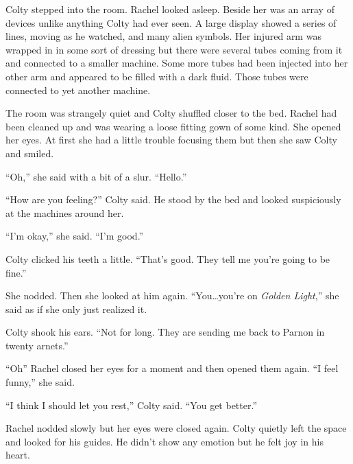 
Colty stepped into the room. Rachel looked asleep. Beside her was an array of devices unlike
anything Colty had ever seen. A large display showed a series of lines, moving as he watched,
and many alien symbols. Her injured arm was wrapped in in some sort of dressing but there were
several tubes coming from it and connected to a smaller machine. Some more tubes had been
injected into her other arm and appeared to be filled with a dark fluid. Those tubes were
connected to yet another machine.

The room was strangely quiet and Colty shuffled closer to the bed. Rachel had been cleaned up
and was wearing a loose fitting gown of some kind. She opened her eyes. At first she had a
little trouble focusing them but then she saw Colty and smiled.

``Oh,'' she said with a bit of a slur. ``Hello.''

``How are you feeling?'' Colty said. He stood by the bed and looked suspiciously at the machines
around her.

``I'm okay,'' she said. ``I'm good.''

Colty clicked his teeth a little. ``That's good. They tell me you're going to be fine.''

She nodded. Then she looked at him again. ``You\ldots you're on \textit{Golden Light},'' she
said as if she only just realized it.

Colty shook his ears. ``Not for long. They are sending me back to Parnon in twenty arnets.''

``Oh'' Rachel closed her eyes for a moment and then opened them again. ``I feel funny,'' she
said.

``I think I should let you rest,'' Colty said. ``You get better.''

Rachel nodded slowly but her eyes were closed again. Colty quietly left the space and looked for
his guides. He didn't show any emotion but he felt joy in his heart.


